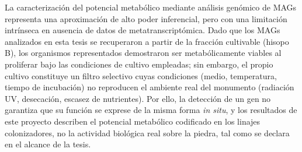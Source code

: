 La caracterización del potencial metabólico mediante análisis genómico
de MAGs representa una aproximación de alto poder inferencial, pero
con una limitación intrínseca en ausencia de datos de
metatranscriptómica. Dado que los MAGs analizados en esta tesis se
recuperaron a partir de la fracción cultivable (hisopo B), los
organismos representados demostraron ser metabólicamente viables al
proliferar bajo las condiciones de cultivo empleadas; sin embargo, el
propio cultivo constituye un filtro selectivo cuyas condiciones
(medio, temperatura, tiempo de incubación) no reproducen el ambiente
real del monumento (radiación UV, desecación, escasez de nutrientes).
Por ello, la detección de un gen no garantiza que su función se
exprese de la misma forma \textit{in situ}, y los resultados de este
proyecto describen el potencial metabólico codificado en los linajes
colonizadores, no la actividad biológica real sobre la piedra, tal
como se declara en el alcance de la tesis.
